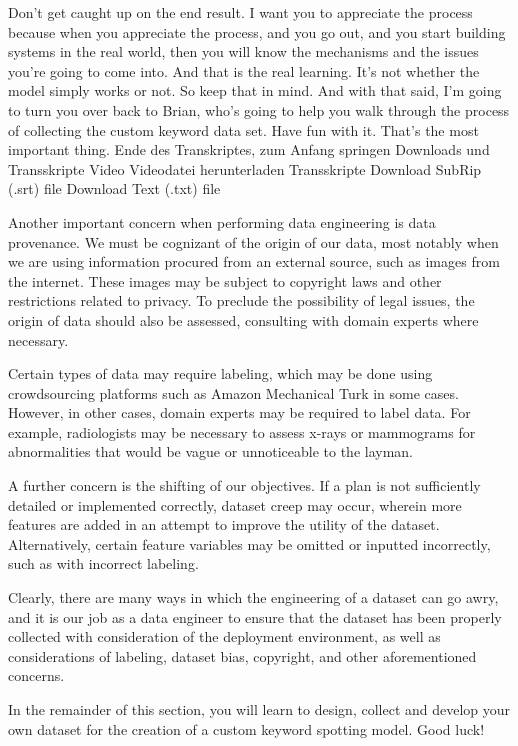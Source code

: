     Don't get caught up on the end result. I want
    you to appreciate the process because when you appreciate the process,
    and you go out, and you start building systems in the real world,
    then you will know the mechanisms and the issues you're going to come into.
    And that is the real learning.
    It's not whether the model simply works or not.
    So keep that in mind.
    And with that said, I'm going to turn you over
    back to Brian, who's going to help you walk through the process of collecting
    the custom keyword data set.
    Have fun with it.
    That's the most important thing.
    Ende des Transkriptes, zum Anfang springen
    Downloads und Transskripte
    Video
    Videodatei herunterladen
    Transskripte
    Download SubRip (.srt) file
    Download Text (.txt) file    
    
    Another important concern when performing data engineering is data provenance. We must be cognizant of the origin of our data, most notably when we are using information procured from an external source, such as images from the internet. These images may be subject to copyright laws and other restrictions related to privacy. To preclude the possibility of legal issues, the origin of data should also be assessed, consulting with domain experts where necessary.
    
    Certain types of data may require labeling, which may be done using crowdsourcing platforms such as Amazon Mechanical Turk in some cases. However, in other cases, domain experts may be required to label data. For example, radiologists may be necessary to assess x-rays or mammograms for abnormalities that would be vague or unnoticeable to the layman.
    
    A further concern is the shifting of our objectives. If a plan is not sufficiently detailed or implemented correctly, dataset creep may occur, wherein more features are added in an attempt to improve the utility of the dataset. Alternatively, certain feature variables may be omitted or inputted incorrectly, such as with incorrect labeling. 
    
    Clearly, there are many ways in which the engineering of a dataset can go awry, and it is our job as a data engineer to ensure that the dataset has been properly collected with consideration of the deployment environment, as well as considerations of labeling, dataset bias, copyright, and other aforementioned concerns.
    
    In the remainder of this section, you will learn to design, collect and develop your own dataset for the creation of a custom keyword spotting model. Good luck!

